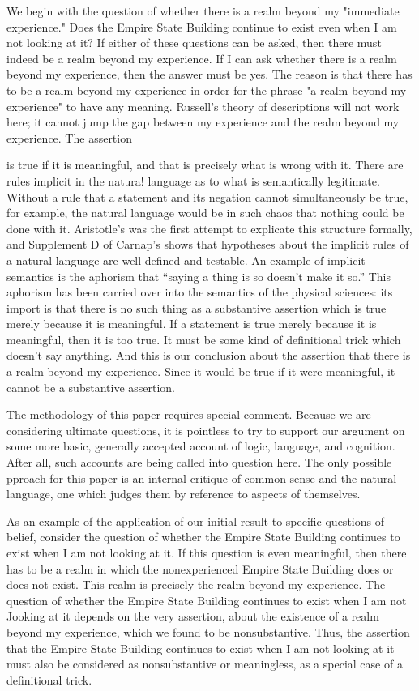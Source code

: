 \documentclass[10pt,twoside]{memoir}
\newcommand{\speech}[1]{
	\textquote{\emph{#1}}}
\begin{document}
We begin with the question of whether there is a realm beyond my 
"immediate experience." Does the Empire State Building continue to exist 
even when I am not looking at it? If either of these questions can be asked, 
then there must indeed be a realm beyond my experience. If I can ask 
whether there is a realm beyond my experience, then the answer must be 
yes. The reason is that there has to be a realm beyond my experience in 
order for the phrase "a realm beyond my experience" to have any meaning. 
Russell's theory of descriptions will not work here; it cannot jump the gap 
between my experience and the realm beyond my experience. The assertion 
\speech{There is a realm beyond my experience} is true if it is meaningful, and that 
is precisely what is wrong with it. There are rules implicit in the natura! 
language as to what is semantically legitimate. Without a rule that a 
statement and its negation cannot simultaneously be true, for example, the 
natural language would be in such chaos that nothing could be done with it. 
Aristotle's  was the first attempt to explicate this structure formally, 
and Supplement D of Carnap's  shows that hypotheses 
about the implicit rules of a natural language are well-defined and testable. 
An example of implicit semantics is the aphorism that \enquote{saying a thing is so 
doesn't make it so.} This aphorism has been carried over into the semantics 
of the physical sciences: its import is that there is no such thing as a 
substantive assertion which is true merely because it is meaningful. If a 
statement is true merely because it is meaningful, then it is too true. It must 
be some kind of definitional trick which doesn't say anything. And this is 
our conclusion about the assertion that there is a realm beyond my 
experience. Since it would be true if it were meaningful, it cannot be a 
substantive assertion. 

The methodology of this paper requires special comment. Because we 
are considering ultimate questions, it is pointless to try to support our 
argument on some more basic, generally accepted account of logic, language, 
and cognition. After all, such accounts are being called into question here. 
The only possible pproach for this paper is an internal critique of common 
sense and the natural language, one which judges them by reference to 
aspects of themselves. 

As an example of the application of our initial result to specific 
questions of belief, consider the question of whether the Empire State 
Building continues to exist when I am not looking at it. If this question is 
even meaningful, then there has to be a realm in which the nonexperienced 
Empire State Building does or does not exist. This realm is precisely the 
realm beyond my experience. The question of whether the Empire State 
Building continues to exist when I am not Jooking at it depends on the very 
assertion, about the existence of a realm beyond my experience, which we 
found to be nonsubstantive. Thus, the assertion that the Empire State 
Building continues to exist when I am not looking at it must also be 
considered as nonsubstantive or meaningless, as a special case of a 
definitional trick. 
\end{document}
